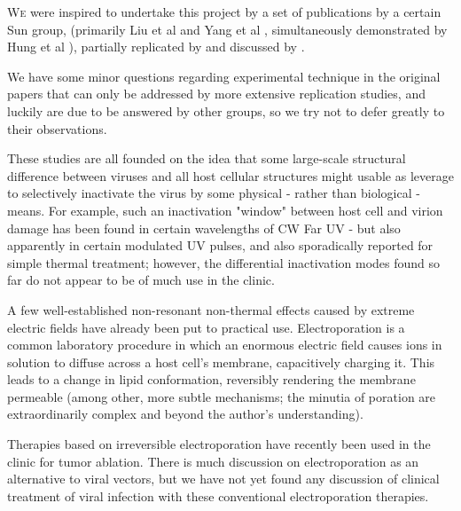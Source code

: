 \documentclass[paper.tex]{subfiles}
\begin{document}





\begin{multicols}{1}

\lettrine{W}e were inspired to undertake this project by a set of publications by a certain Sun group, (primarily Liu et al \cite{Microwave2009} and Yang et al \cite{Efficient2015}, simultaneously demonstrated by Hung et al \cite{focusing2014}), partially replicated by \cite{Optical2020} and discussed by \cite{Theoretical2020}.

We have some minor questions regarding experimental technique in the original papers that can only be addressed by more extensive replication studies, and luckily are due to be answered by other groups\cite{Generating}, so we try not to defer greatly to their observations. 

These studies are all founded on the idea that some large-scale structural difference between viruses and all host cellular structures might usable as leverage to selectively inactivate the virus by some physical - rather than biological - means. For example, such an inactivation "window" between host cell and virion damage has been found in certain wavelengths of CW Far UV\cite{Germicidal2017} - but also apparently in certain modulated UV pulses\cite{Use1987a}\cite{Can1993}, and also sporadically reported for simple thermal treatment\cite{Summary}; however, the differential inactivation modes found so far do not appear to be of much use in the clinic.

A few well-established non-resonant non-thermal effects caused by extreme electric fields have already been put to practical use. Electroporation\cite{Electroporation1988} is a common laboratory procedure in which an enormous electric field causes ions in solution to diffuse across a host cell's membrane, capacitively charging it. This leads to a change in lipid conformation, reversibly rendering the membrane permeable (among other, more subtle mechanisms; the minutia of poration are extraordinarily complex and beyond the author's understanding\cite{Theoretical2007}). 

Therapies based on irreversible electroporation\cite{Nonthermal2013}\cite{Lipid2017} have recently been used in the clinic\cite{Irreversible2013} for tumor ablation. There is much discussion on electroporation as an alternative to viral vectors, but we have not yet found any discussion of clinical treatment of viral infection with these conventional electroporation therapies.%


\end{multicols}
\end{document}
